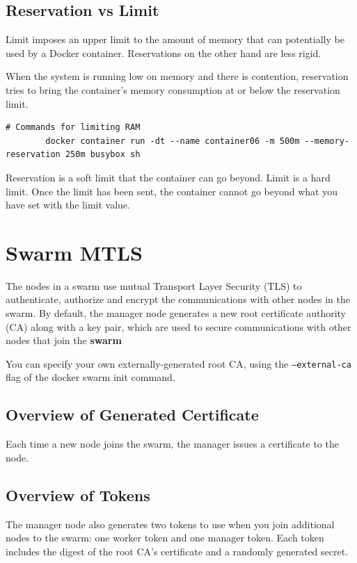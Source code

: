\documentclass[11pt]{book}
\begin{document}
    \subsection{Reservation vs Limit}
    Limit imposes an upper limit to the amount of memory that can potentially be used by a Docker container.
    Reservations on the other hand are less rigid.

    When the system is running low on memory and there is contention, reservation tries to bring the container's memory consumption at or below the reservation limit.


    \begin{lstlisting}[style=terminal]
        # Commands for limiting RAM
        docker container run -dt --name container06 -m 500m --memory-reservation 250m busybox sh
    \end{lstlisting}

    Reservation is a soft limit that the container can go beyond.
    Limit is a hard limit. Once the limit has been sent, the container cannot go beyond what you have set with the limit value.

    \section{Swarm MTLS}
    The nodes in a swarm use mutual Transport Layer Security (TLS) to authenticate, authorize and encrypt the communications with other nodes in the swarm.
    By default, the manager node generates a new root certificate authority (CA) along with a key pair, which are used to secure communications with other nodes that join the \textbf{swarm}

    You can specify your own externally-generated root CA, using the \texttt{--external-ca} flag of the docker swarm init command.

    \subsection{Overview of Generated Certificate}
    Each time a new node joins the swarm, the manager issues a certificate to the node.

    \subsection{Overview of Tokens}
    The manager node also generates two tokens to use when you join additional nodes to the swarm: one worker token and one manager token.
    Each token includes the digest of the root CA's certificate and a randomly generated secret.
\end{document}
